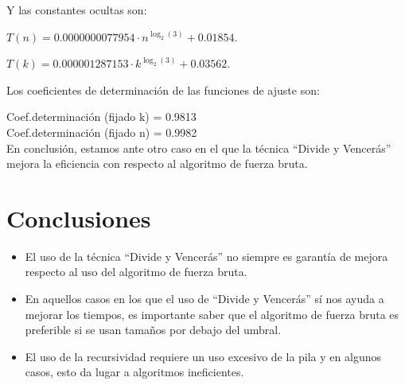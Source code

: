 \documentclass[10pt,a4paper]{article}
\begin{document}
\begin{enumerate}
Y las constantes ocultas son:

\( T(n) = 0.0000000077954 \cdot n^{\log_{2}(3)} + 0.01854\).

\( T(k) = 0.000001287153 \cdot k^{\log_{2}(3)} + 0.03562\).
	
Los coeficientes de determinación de las funciones de ajuste son:

Coef.determinación (fijado k) = 0.9813\\
Coef.determinación (fijado n) = 0.9982\\

En conclusión, estamos ante otro caso en el que la técnica ``Divide y Vencerás'' mejora la eficiencia con respecto al algoritmo de fuerza bruta.

\section{Conclusiones}
\begin{itemize}
	\item El uso de la técnica ``Divide y Vencerás'' no siempre es garantía de mejora respecto al uso del algoritmo de fuerza bruta.
	
	\item En aquellos casos en los que el uso de ``Divide y Vencerás'' sí nos ayuda a mejorar los tiempos, es importante saber que el algoritmo de fuerza bruta es preferible si se usan tamaños por debajo del umbral.
	
	\item El uso de la recursividad requiere un uso excesivo de la pila y en algunos casos, esto da lugar a algoritmos ineficientes.
	
	
\end{itemize}
 
\end{enumerate}
\end{document}
